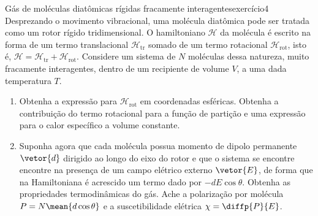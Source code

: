 \begin{exercício}{Gás de moléculas diatômicas rígidas fracamente interagentes}{exercício4}
    Desprezando o movimento vibracional, uma molécula diatômica pode ser tratada como um rotor rígido tridimensional. O hamiltoniano \(\mathcal{H}\) da molécula é escrito na forma de um termo translacional \(\mathcal{H}_{\mathrm{tr}}\) somado de um termo rotacional \(\mathcal{H}_{\mathrm{rot}}\), isto é, \(\mathcal{H}=\mathcal{H}_{\mathrm{tr}} + \mathcal{H}_{\mathrm{rot}}\). Considere um sistema de \(N\) moléculas dessa natureza, muito fracamente interagentes, dentro de um recipiente de volume \(V\), a uma dada temperatura \(T\).
    \begin{enumerate}[label=(\alph*)]
        \item Obtenha a expressão para \(\mathcal{H}_{\mathrm{rot}}\) em coordenadas esféricas. Obtenha a contribuição do termo rotacional para a função de partição e uma expressão para o calor específico a volume constante.
        \item Suponha agora que cada molécula possua momento de dipolo permanente \(\vetor{d}\) dirigido ao longo do eixo do rotor e que o sistema se encontre encontre na presença de um campo elétrico externo \(\vetor{E}\), de forma que na Hamiltoniana é acrescido um termo dado por \(-d E \cos\theta\). Obtenha as propriedades termodinâmicas do gás. Ache a polarização por molécula \(P = N\mean{d \cos\theta}\) e a suscetibilidade elétrica \(\chi = \diffp{P}{E}\).
    \end{enumerate}
\end{exercício}
